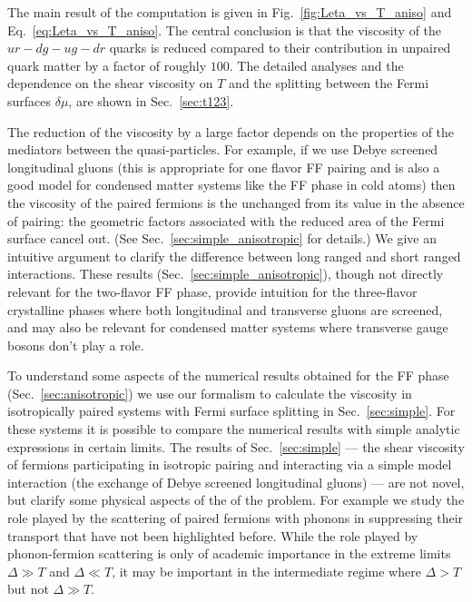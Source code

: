 \documentclass[10pt, aps, prd, superscriptaddress, nofootinbib, 
               amsmath, amssymb, twocolumn,
               preprintnumbers, showpacs,
               raggedbottom,
               floatfix]{revtex4-1}
\begin{document}
The main result of the computation is given in Fig.~\ref{fig:Leta_vs_T_aniso} 
and Eq.~\ref{eq:Leta_vs_T_aniso}. The central conclusion is that the viscosity
of the $ur-dg-ug-dr$ quarks is reduced compared to their contribution in
unpaired quark matter by a factor of roughly $100$. The detailed analyses and
the dependence on the shear viscosity on $T$ and the splitting
between the Fermi surfaces $\delta\mu$, are shown in Sec.~\ref{sec:t123}.

The reduction of the viscosity by a large factor depends on the properties of
the mediators between the quasi-particles. For example, if we use Debye
screened longitudinal gluons (this is appropriate for one flavor FF pairing
and is also a good model for condensed matter systems like the FF phase in cold
atoms) then the viscosity of the paired fermions is the unchanged from its
value in the absence of pairing: the geometric factors associated with the
reduced area of the Fermi surface cancel out. (See
Sec.~\ref{sec:simple_anisotropic} for details.) We give an intuitive argument
to clarify the difference between long ranged and short ranged interactions.
These results (Sec.~\ref{sec:simple_anisotropic}), though not directly relevant for the two-flavor FF phase,
provide intuition for the three-flavor crystalline phases where both
longitudinal and transverse gluons are screened, and may also be relevant for
condensed matter systems where transverse gauge bosons don't play a role.   

To understand some aspects of the numerical results obtained for the FF phase
(Sec.~\ref{sec:anisotropic}) we use our formalism to calculate the viscosity in
isotropically paired systems with Fermi surface splitting in
Sec.~\ref{sec:simple}. For these systems it is possible to compare the
numerical results with simple analytic expressions in certain limits.  The
results of Sec.~\ref{sec:simple} --- the shear viscosity of fermions
participating in isotropic pairing and interacting via a simple model
interaction (the exchange of Debye screened longitudinal gluons) --- are not
novel, but clarify some physical aspects of the of the problem. For example we
study the role played by the scattering of paired fermions with phonons in
suppressing their transport that have not been highlighted before. While the
role played by phonon-fermion scattering is only of academic importance in the
extreme limits $\Delta\gg T$ and $\Delta\ll T$, it may be important in the
intermediate regime where $\Delta>T$ but not $\Delta\gg T$.

 
\end{document}
